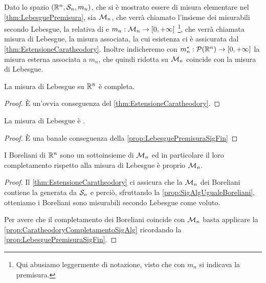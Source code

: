 \begin{definition}\label{def:LebesgueMisura}
	Dato lo spazio $(\R^n,\S_n,m_n)$, che si è mostrato essere di misura elementare nel \cref{thm:LebesguePremisura}, sia $\M_n$, che verrà chiamato l'insieme dei misurabili secondo Lebesgue, la relativa \sigalg{} di \carat{} e $m_n:\M_n\to\Rpiu$ \footnote{Qui abusiamo leggermente di notazione, visto che con $m_n$ si indicava la premisura.}, che verrà chiamata misura di Lebesgue, la misura associata, la cui esistenza ci è assicurata dal \cref{thm:EstensioneCaratheodory}. 
	Inoltre indicheremo con $m_n^*:\mathcal P(\R^n)\to\Rpiu$ la misura esterna associata a $m_n$, che quindi ridotta su $\M_n$ coincide con la misura di Lebesgue.
\end{definition}

\begin{remark}\label{nota:LebesgueCompletezza}
	La misura di Lebesgue su $\R^n$ è completa.
\end{remark}
\begin{proof}
	È un'ovvia conseguenza del \cref{thm:EstensioneCaratheodory}.
\end{proof}

\begin{remark}\label{nota:LebesgueSigFin}
	La misura di Lebesgue è \sigfin{}.
\end{remark}
\begin{proof}
	È una banale conseguenza della \cref{prop:LebesguePremisuraSigFin}
\end{proof}

\begin{proposition}\label{prop:CompletamentoBoreliani}
	I Boreliani di $\R^n$ sono un sottoinsieme di $\M_n$ ed in particolare il loro completamento rispetto alla misura di Lebesgue è proprio $\M_n$.
\end{proposition}
\begin{proof}
	Il \cref{thm:EstensioneCaratheodory} ci assicura che la \sigalg{} $\M_n$ dei Boreliani contiene la \sigalg{} generata da $\S_n$ e perciò, sfruttando la \cref{prop:SigAlgUgualeBoreliani}, otteniamo i Boreliani sono misurabili secondo Lebesgue come voluto.
	
	Per avere che il completamento dei Boreliani coincide con $\M_n$ basta applicare la \cref{prop:CaratheodoryCompletamentoSigAlg} ricordando la \cref{prop:LebesguePremisuraSigFin}.
\end{proof}

